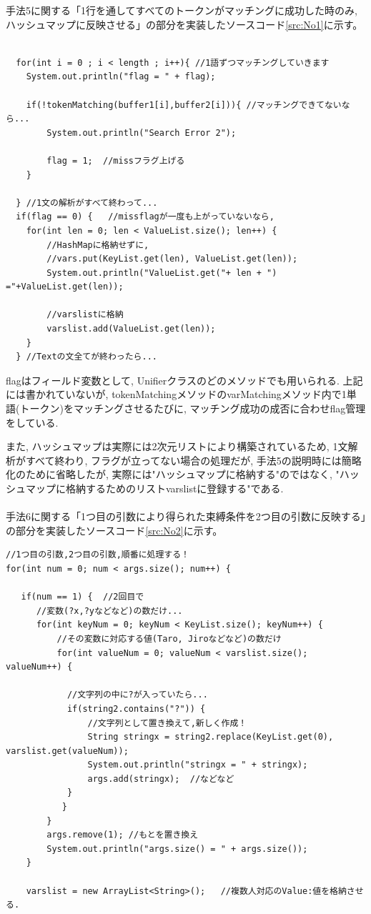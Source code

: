 \documentclass[uplatex,12pt]{jsarticle}
\begin{document}
手法5に関する「1行を通してすべてのトークンがマッチングに成功した時のみ, ハッシュマップに反映させる」の部分を実装したソースコード\ref{src:No1}に示す。
\begin{lstlisting}[caption=1文すべて終わったら格納する,label=src:No1]

  for(int i = 0 ; i < length ; i++){ //1語ずつマッチングしていきます
	System.out.println("flag = " + flag);

	if(!tokenMatching(buffer1[i],buffer2[i])){ //マッチングできてないなら...
		System.out.println("Search Error 2");

		flag = 1;  //missフラグ上げる
	}

  } //1文の解析がすべて終わって...
  if(flag == 0) {	//missflagが一度も上がっていないなら,
	for(int len = 0; len < ValueList.size(); len++) {
	    //HashMapに格納せずに,
	    //vars.put(KeyList.get(len), ValueList.get(len));
	    System.out.println("ValueList.get("+ len + ") ="+ValueList.get(len));

	    //varslistに格納
	    varslist.add(ValueList.get(len));
	}
  } //Textの文全てが終わったら...
\end{lstlisting}

flagはフィールド変数として, Unifierクラスのどのメソッドでも用いられる. 上記には書かれていないが, tokenMatchingメソッドのvarMatchingメソッド内で1単語(トークン)をマッチングさせるたびに, マッチング成功の成否に合わせflag管理をしている.

また, ハッシュマップは実際には2次元リストにより構築されているため, 1文解析がすべて終わり, フラグが立ってない場合の処理だが, 手法5の説明時には簡略化のために省略したが, 実際には"ハッシュマップに格納する"のではなく, "ハッシュマップに格納するためのリストvarslistに登録する"である.\\\\

手法6に関する「1つ目の引数により得られた束縛条件を2つ目の引数に反映する」の部分を実装したソースコード\ref{src:No2}に示す。

\begin{lstlisting}[caption=第1引数から第2引数への変数束縛条件の引継ぎ ,label=src:No2]
//1つ目の引数,2つ目の引数,順番に処理する！
for(int num = 0; num < args.size(); num++) {

   if(num == 1) {  //2回目で
      //変数(?x,?yなどなど)の数だけ...
      for(int keyNum = 0; keyNum < KeyList.size(); keyNum++) {
          //その変数に対応する値(Taro, Jiroなどなど)の数だけ
          for(int valueNum = 0; valueNum < varslist.size(); valueNum++) {

    		//文字列の中に?が入っていたら...
    		if(string2.contains("?")) {
    			//文字列として置き換えて,新しく作成！
    			String stringx = string2.replace(KeyList.get(0), varslist.get(valueNum));
    			System.out.println("stringx = " + stringx);
    			args.add(stringx);	//などなど
    		}
    	   }
    	}
    	args.remove(1); //もとを置き換え
    	System.out.println("args.size() = " + args.size());
    }	
     
    varslist = new ArrayList<String>();   //複数人対応のValue:値を格納させる.
\end{lstlisting}
\end{document}
